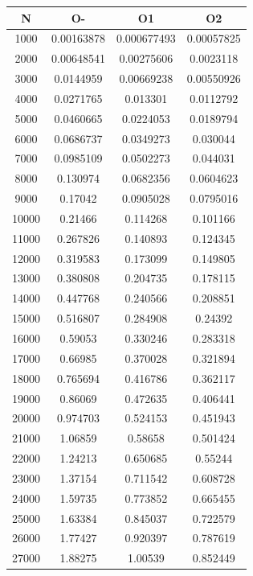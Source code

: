 \begin{center}
\begin{tabular}{| c | c | c | c |}
\hline
\textbf{N} & \textbf{O-} & \textbf{O1} & \textbf{O2} \\ \hline
1000 & 0.00163878 & 0.000677493 & 0.00057825 \\ \hline
2000 & 0.00648541 & 0.00275606 & 0.0023118 \\ \hline
3000 & 0.0144959 & 0.00669238 & 0.00550926 \\ \hline
4000 & 0.0271765 & 0.013301 & 0.0112792 \\ \hline
5000 & 0.0460665 & 0.0224053 & 0.0189794 \\ \hline
6000 & 0.0686737 & 0.0349273 & 0.030044 \\ \hline
7000 & 0.0985109 & 0.0502273 & 0.044031 \\ \hline
8000 & 0.130974 & 0.0682356 & 0.0604623 \\ \hline
9000 & 0.17042 & 0.0905028 & 0.0795016 \\ \hline
10000 & 0.21466 & 0.114268 & 0.101166 \\ \hline
11000 & 0.267826 & 0.140893 & 0.124345 \\ \hline
12000 & 0.319583 & 0.173099 & 0.149805 \\ \hline
13000 & 0.380808 & 0.204735 & 0.178115 \\ \hline
14000 & 0.447768 & 0.240566 & 0.208851 \\ \hline
15000 & 0.516807 & 0.284908 & 0.24392 \\ \hline
16000 & 0.59053 & 0.330246 & 0.283318 \\ \hline
17000 & 0.66985 & 0.370028 & 0.321894 \\ \hline
18000 & 0.765694 & 0.416786 & 0.362117 \\ \hline
19000 & 0.86069 & 0.472635 & 0.406441 \\ \hline
20000 & 0.974703 & 0.524153 & 0.451943 \\ \hline
21000 & 1.06859 & 0.58658 & 0.501424 \\ \hline
22000 & 1.24213 & 0.650685 & 0.55244 \\ \hline
23000 & 1.37154 & 0.711542 & 0.608728 \\ \hline
24000 & 1.59735 & 0.773852 & 0.665455 \\ \hline
25000 & 1.63384 & 0.845037 & 0.722579 \\ \hline
26000 & 1.77427 & 0.920397 & 0.787619 \\ \hline
27000 & 1.88275 & 1.00539 & 0.852449 \\ \hline

\end{tabular}
\end{center}

